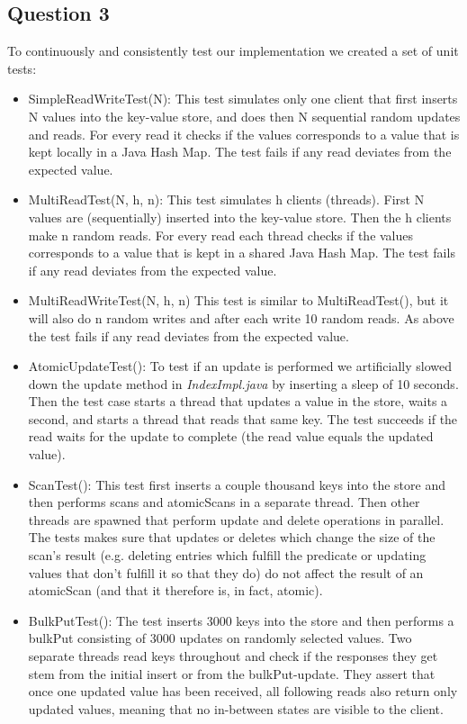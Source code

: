 \documentclass[12pt,a4paper]{article}
\begin{document}
\subsection*{Question 3}
\label{sec:pq3}
To continuously and consistently test our implementation we created a set of unit tests:
\begin{itemize}
\item SimpleReadWriteTest(N): This test simulates only one client that first inserts N values into the key-value store, and does then N sequential random updates and reads. For every read it checks if the values corresponds to a value that is kept locally in a Java Hash Map. The test fails if any read deviates from the expected value.
\item MultiReadTest(N, h, n): This test simulates h clients (threads). First N values are (sequentially) inserted into the key-value store. Then the h clients make n random reads. For every read each thread checks if the values corresponds to a value that is kept in a shared Java Hash Map. The test fails if any read deviates from the expected value.
\item MultiReadWriteTest(N, h, n) This test is similar to MultiReadTest(), but it will also do n random writes and after each write 10 random reads. As above the test fails if any read deviates from the expected value.
\item AtomicUpdateTest(): To test if an update is performed we artificially slowed down the update method in \emph{IndexImpl.java} by inserting a sleep of 10 seconds. Then the test case starts a thread that updates a value in the store, waits a second, and starts a thread that reads that same key. The test succeeds if the read waits for the update to complete (the read value equals the updated value).
\item ScanTest(): This test first inserts a couple thousand keys into the store and then performs scans and atomicScans in a separate thread. Then other threads are spawned that perform update and delete operations in parallel. The tests makes sure that updates or deletes which change the size of the scan's result (e.g. deleting entries which fulfill the predicate or updating values that don't fulfill it so that they do) do not affect the result of an atomicScan (and that it therefore is, in fact, atomic).
\item BulkPutTest(): The test inserts 3000  keys into the store and then performs a bulkPut consisting of 3000 updates on randomly selected values. Two separate threads read keys throughout and check if the responses they get stem from the initial insert or from the bulkPut-update. They assert that once one updated value has been received, all following reads also return only updated values, meaning that no in-between states are visible to the client.


\end{itemize}
\end{document}
